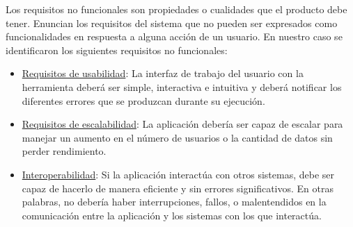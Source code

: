 Los requisitos no funcionales son propiedades o cualidades que el producto debe tener. Enuncian los requisitos del sistema que no pueden ser expresados como funcionalidades en respuesta a alguna acción de un usuario. En nuestro caso se identificaron los siguientes requisitos no funcionales:
        
\begin{itemize}
    \item \underline{Requisitos de usabilidad}: La interfaz de trabajo del usuario con la herramienta deberá ser simple, interactiva e intuitiva y deberá notificar los diferentes errores que se produzcan durante su ejecución.
    \item \underline{Requisitos de escalabilidad}: La aplicación debería ser capaz de escalar para manejar un aumento en el número de usuarios o la cantidad de datos sin perder rendimiento.     
    \item \underline{Interoperabilidad}: Si la aplicación interactúa con otros sistemas, debe ser capaz de hacerlo de manera eficiente y sin errores significativos. En otras palabras, no debería haber interrupciones, fallos, o malentendidos en la comunicación entre la aplicación y los sistemas con los que interactúa.
\end{itemize}

